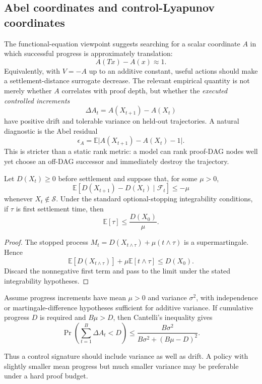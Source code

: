 \subsection{Abel coordinates and control-Lyapunov coordinates}
The functional-equation viewpoint suggests searching for a scalar coordinate $A$ in which successful progress is approximately translation:
\[
 A(Tx)-A(x)\approx 1.
\]
Equivalently, with $V=-A$ up to an additive constant, useful actions should make a settlement-distance surrogate decrease. The relevant empirical quantity is not merely whether $A$ correlates with proof depth, but whether the \emph{executed controlled increments}
\[
 \Delta A_t=A(X_{t+1})-A(X_t)
\]
have positive drift and tolerable variance on held-out trajectories. A natural diagnostic is the Abel residual
\[
 \epsilon_A=\mathbb E\bigl|A(X_{t+1})-A(X_t)-1\bigr|.
\]
This is stricter than a static rank metric: a model can rank proof-DAG nodes well yet choose an off-DAG successor and immediately destroy the trajectory.

\begin{theorem}
Let $D(X_t)\ge 0$ before settlement and suppose that, for some $\mu>0$,
\[
 \mathbb E[D(X_{t+1})-D(X_t)\mid\mathcal F_t]\le -\mu
\]
whenever $X_t\notin\mathcal S$. Under the standard optional-stopping integrability conditions, if $\tau$ is first settlement time, then
\[
 \mathbb E[\tau]\le \frac{D(X_0)}{\mu}.
\]
\end{theorem}
\begin{proof}
The stopped process $M_t=D(X_{t\wedge\tau})+\mu(t\wedge\tau)$ is a supermartingale. Hence
\[
 \mathbb E[D(X_{t\wedge\tau})]+\mu\mathbb E[t\wedge\tau]\le D(X_0).
\]
Discard the nonnegative first term and pass to the limit under the stated integrability hypotheses.
\end{proof}

\begin{theorem}
Assume progress increments have mean $\mu>0$ and variance $\sigma^2$, with independence or martingale-difference hypotheses sufficient for additive variance. If cumulative progress $D$ is required and $B\mu>D$, then Cantelli's inequality gives
\[
 \Pr\!\left(\sum_{t=1}^B\Delta A_t<D\right)
 \le
 \frac{B\sigma^2}{B\sigma^2+(B\mu-D)^2}.
\]
\end{theorem}

Thus a control signature should include variance as well as drift. A policy with slightly smaller mean progress but much smaller variance may be preferable under a hard proof budget.

